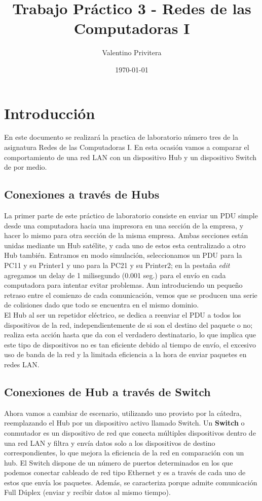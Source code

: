 \documentclass{article}
\title{\textbf{Trabajo Práctico 3 - Redes de las Computadoras I}}
\author{Valentino Privitera}
\date{\today}
\begin{document}
\maketitle


\section{Introducción}
En este documento se realizará la practica de laboratorio número tres de la asignatura Redes de las Computadoras I. En esta ocasión vamos a comparar el comportamiento de una red LAN con un dispositivo Hub y un dispositivo Switch de por medio.


\subsection{Conexiones a través de Hubs}

La primer parte de este práctico de laboratorio consiste en enviar un PDU simple desde una computadora hacia una impresora en una sección de la empresa, y hacer lo mismo para otra sección de la misma empresa. Ambas secciones están unidas mediante un Hub satélite, y cada uno de estos esta centralizado a otro Hub  también. Entramos en modo simulación, seleccionamos un PDU para la PC11 y su Printer1 y uno para la PC21 y su Printer2; en la pestaña \textit{edit} agregamos un delay de 1 milisegundo (0.001 seg.) para el envío en cada computadora para intentar evitar problemas. Aun introduciendo un pequeño retraso entre el comienzo de cada comunicación, vemos que se producen una serie de colisiones dado que todo se encuentra en el mismo dominio.\\

{\setlength{\parindent}{1pt} El Hub al ser un repetidor eléctrico, se dedica a reenviar el PDU a todos los dispositivos de la red, independientemente de si son el destino del paquete o no; realiza esta acción hasta que da con el verdadero destinatario, lo que implica que este tipo de dispositivos no es tan eficiente debido al tiempo de envío, el excesivo uso de banda de la red y la limitada eficiencia a la hora de enviar paquetes en redes LAN.} 


\subsection{Conexiones de Hub a través de Switch}

Ahora vamos a cambiar de escenario, utilizando uno provisto por la cátedra, reemplazando el Hub por un dispositivo activo llamado Switch. Un \textbf{Switch} o conmutador es un dispositivo de red que conecta múltiples dispositivos dentro de una red LAN y filtra y envía datos solo a los dispositivos de destino correspondientes, lo que mejora la eficiencia de la red en comparación con un hub. El Switch dispone de un número de puertos determinados en los que podemos conectar cableado de red tipo Ethernet y es a través de cada uno de estos que envía los paquetes. Además, se caracteriza porque admite comunicación Full Dúplex (enviar y recibir datos al mismo tiempo).\\
 
\end{document}
